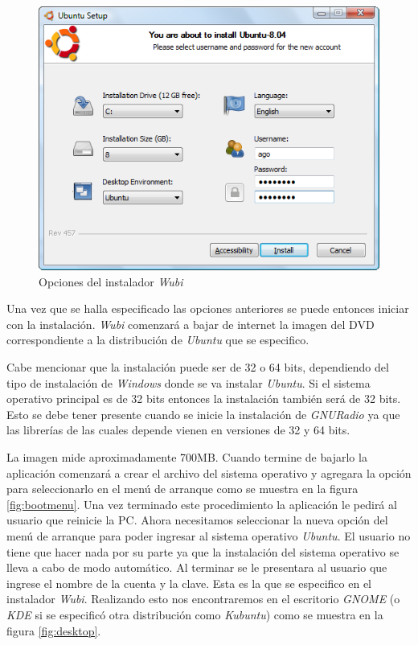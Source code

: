 \begin{figure}[hpt]
\centering
	\includegraphics[scale=0.5]{figs/wubi}
	\vspace{0.1in}
	\caption{Opciones del instalador \emph{Wubi}}
	\label{fig:wubi}
\end{figure}

Una vez que se halla especificado las opciones anteriores se puede entonces
iniciar con la instalaci\'on. \emph{Wubi} comenzar\'a a bajar de internet la
imagen del DVD correspondiente a la distribuci\'on de \emph{Ubuntu} que se
especifico.

Cabe mencionar que la instalaci\'on puede ser de 32 o 64 bits, dependiendo del
tipo de instalaci\'on de \emph{Windows} donde se va instalar \emph{Ubuntu}. Si
el sistema operativo principal es de 32 bits entonces la instalaci\'on tambi\'en
ser\'a de 32 bits. Esto se debe tener presente cuando se inicie la instalaci\'on
de \emph{GNURadio} ya que las librer\'ias de las cuales depende vienen en
versiones de 32 y 64 bits.

La imagen mide aproximadamente 700MB. Cuando termine de bajarlo la aplicaci\'on
comenzar\'a a crear el archivo del sistema operativo y agregara la opci\'on para
seleccionarlo en el men\'u de arranque como se muestra en la figura
\ref{fig:bootmenu}. Una vez terminado este procedimiento la aplicaci\'on le
pedir\'a al usuario que reinicie la PC. Ahora necesitamos seleccionar la nueva opci\'on del men\'u
de arranque para poder ingresar al sistema operativo \emph{Ubuntu}. El usuario no tiene que hacer
nada por su parte ya que la instalaci\'on del sistema operativo se lleva a cabo
de modo autom\'atico. Al terminar se le presentara al usuario que ingrese el
nombre de la cuenta y la clave. Esta es la que se especifico en el instalador
\emph{Wubi}. Realizando esto nos encontraremos en el escritorio \emph{GNOME} (o
\emph{KDE} si se especific\'o otra distribuci\'on como \emph{Kubuntu}) como se
muestra en la figura \ref{fig:desktop}.

